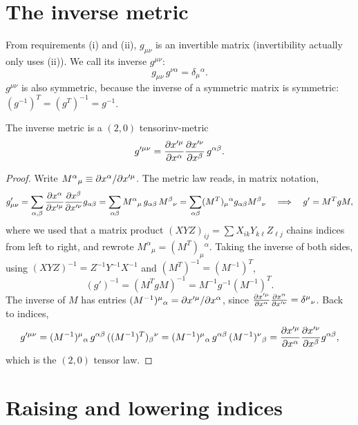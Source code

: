 \section{The inverse metric}

From requirements (i) and (ii), $g_{\mu\nu}$ is an invertible matrix (invertibility actually only uses (ii)). We call its inverse $g^{\mu\nu}$:
\begin{equation}
  g_{\mu\nu}\,g^{\nu\alpha}=\delta_\mu{}^\alpha .
\end{equation}
$g^{\mu\nu}$ is also symmetric, because the inverse of a symmetric matrix is symmetric: $(g^{-1})^T=(g^T)^{-1}=g^{-1}$.

\begin{proposition}{The inverse metric is a $(2,0)$ tensor}{inv-metric}
\begin{equation}
  g'^{\mu\nu}=\frac{\partial x'^\mu}{\partial x^\alpha}\frac{\partial x'^\nu}{\partial x^\beta}\,g^{\alpha\beta}.
\end{equation}
\end{proposition}
\begin{proof}
Write $M^\alpha{}_\mu\equiv\partial x^\alpha/\partial x'^\mu$. The metric law reads, in matrix notation,
\[
  g'_{\mu\nu}=\sum_{\alpha,\beta}\frac{\partial x^\alpha}{\partial x'^\mu}\frac{\partial x^\beta}{\partial x'^\nu}g_{\alpha\beta}
  =\sum_{\alpha\beta}M^\alpha{}_\mu\,g_{\alpha\beta}\,M^\beta{}_\nu
  =\sum_{\alpha\beta}(M^T)_\mu{}^\alpha g_{\alpha\beta}M^\beta{}_\nu
  \quad\Longrightarrow\quad g'=M^TgM ,
\]
where we used that a matrix product $(XYZ)_{ij}=\sum X_{ik}Y_{k\ell}Z_{\ell j}$ chains indices from left to right, and rewrote $M^\alpha{}_\mu=(M^T)_\mu{}^\alpha$.
Taking the inverse of both sides, using $(XYZ)^{-1}=Z^{-1}Y^{-1}X^{-1}$ and $(M^T)^{-1}=(M^{-1})^T$,
\[
  (g')^{-1}=(M^TgM)^{-1}=M^{-1}g^{-1}(M^{-1})^T .
\]
The inverse of $M$ has entries $(M^{-1})^\mu{}_\alpha=\partial x'^\mu/\partial x^\alpha$, since $\frac{\partial x'^\mu}{\partial x^\alpha}\frac{\partial x^\alpha}{\partial x'^\nu}=\delta^\mu{}_\nu$. Back to indices,
\[
  g'^{\mu\nu}=(M^{-1})^\mu{}_\alpha\,g^{\alpha\beta}\,((M^{-1})^T)_\beta{}^\nu=(M^{-1})^\mu{}_\alpha\,g^{\alpha\beta}\,(M^{-1})^\nu{}_\beta
  =\frac{\partial x'^\mu}{\partial x^\alpha}\frac{\partial x'^\nu}{\partial x^\beta}g^{\alpha\beta},
\]
which is the $(2,0)$ tensor law.
\end{proof}

\section{Raising and lowering indices}

